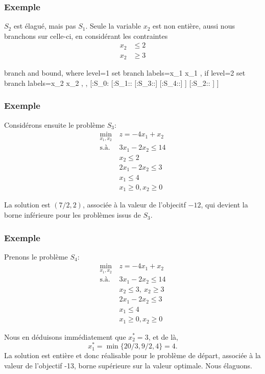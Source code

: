 \documentclass[usepdftitle=false, aspectratio=169]{beamer}
\newcommand{\extraprotect}[1]{\unexpanded{\unexpanded{#1}}}
\begin{document}
\begin{frame}
	\frametitle{Exemple}

$S_2$ est élagué, mais pas $S_1$. Seule la variable $x_2$ est non entière, aussi nous branchons sur celle-ci, en considérant les contraintes
	\begin{align*}
		x_2 &\leq 2 \\
		x_2 &\geq 3
	\end{align*}
	
	\begin{center}
		\begin{forest}
			branch and bound,
			where level=1{
				set branch labels={x_1 }{}{x_1 }{},
			}{
				if level=2{
					set branch labels={x_2 }{}{x_2 }{},
				}{},
			}
			[\extraprotect{\big($\frac{9}{2}$,3\big)}:S_0:\extraprotect{$-15 \leq z^* \leq +\infty$}
			[\extraprotect{\big(4,$\frac{5}{2}$\big)}:S_1:\extraprotect{$-13 \leq z^* \leq +\infty$}:
			[:S_3::]
			[:S_4::]
			]
			[:S_2:\extraprotect{non réalisable}:
			]
			]
		\end{forest}
	\end{center}
	
\end{frame}

\begin{frame}
	\frametitle{Exemple}
	
	Considérons ensuite le problème $S_3$:
	\begin{align*}
		\min_{x_1,x_2} \ & z = -4x_1+x_2 \\
		\mbox{s.à. } & 3x_1 - 2x_2 \leq 14 \\ 
		& x_2 \leq 2 \\
		& 2x_1 - 2x_2 \leq 3 \\
		& x_1 \leq 4 \\
		& x_1 \geq 0, x_2 \geq 0
	\end{align*}
	
	La solution est $(7/2, 2)$, associée à la valeur de l'objecitf $-12$, qui devient la borne inférieure pour les problèmes issus de $S_3$.
	
\end{frame}


\begin{frame}
	\frametitle{Exemple}
	
	Prenons le problème $S_4$:
	\begin{align*}
		\min_{x_1,x_2} \ & z = -4x_1+x_2 \\
		\mbox{s.à. } & 3x_1 - 2x_2 \leq 14 \\ 
		& x_2 \leq 3,\ x_2 \geq 3 \\
		& 2x_1 - 2x_2 \leq 3 \\
		& x_1 \leq 4 \\
		& x_1 \geq 0, x_2 \geq 0
	\end{align*}

Nous en déduisons immédiatement que $x_2^* = 3$, et de là,
$$
x_1^* = \min \{ 20/3, 9/2, 4 \} = 4.
$$
La solution est entière et donc réalisable pour le problème de départ, associée à la valeur de l'objectif -13, borne supérieure sur la valeur optimale. Nous élaguons.

\end{frame}
\end{document}
